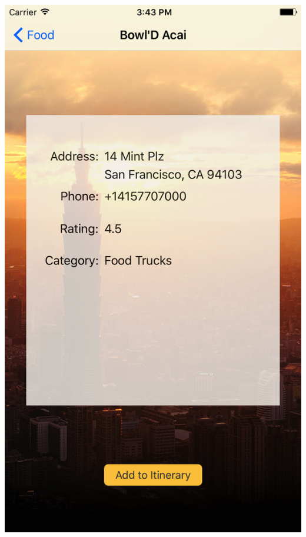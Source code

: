 \documentclass{beamer}
\begin{document}
\begin{frame}
\begin{columns}
\begin{column}{0.3\textwidth}
\begin{center}
            \includegraphics[scale=0.08]{foodDetail}
        \end{center}
    \end{column}
\end{columns}
\end{frame}
\end{document}
